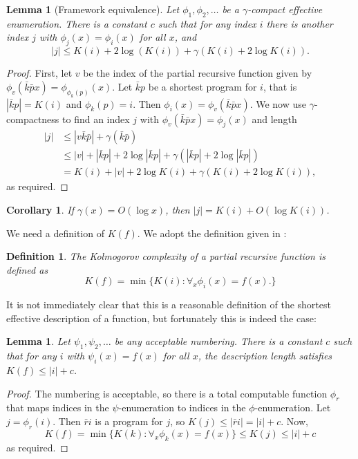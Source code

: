\documentclass{article}
\newtheorem{lemma}[theorem]{Lemma}
\newtheorem{corollary}[theorem]{Corollary}
\newtheorem{definition}{Definition}
\begin{document}
\begin{lemma}[Framework equivalence]
Let $\phi_1,\phi_2,\ldots$ be a $\gamma$-compact effective enumeration. There is a constant $c$ such that for any index $i$ there is another index $j$ with $\phi_j(x)=\phi_i(x)$ for all $x$, and
\[|j|\le K(i)+2\log(K(i))+\gamma(K(i)+2\log K(i)).\]
\end{lemma}
\begin{proof}
First, let $v$ be the index of the partial recursive function given by $\phi_v(\bar k\bar p x)=\phi_{\phi_k(p)}(x)$. Let $\bar k p$ be a shortest program for $i$, that is $|\bar k p| = K(i)$ and $\phi_k(p)=i$. Then $\phi_i(x)=\phi_v(\bar k \bar p x)$. We now use $\gamma$-compactness to find an index $j$ with $\phi_v(\bar k \bar p x)=\phi_j(x)$ and length
\[\begin{split}
|j|&\le |v\bar k\bar p|+\gamma(\bar k\bar p)\\
&\le|v|+|\bar k p|+2\log|\bar k p|+\gamma(|\bar k p|+2\log|\bar k p|)\\
&=K(i)+|v|+2\log K(i)+\gamma(K(i)+2\log K(i)),
\end{split}\]
as required.
\end{proof}
\begin{corollary}
If $\gamma(x)=O(\log x)$, then $|j|=K(i)+O(\log K(i))$.
\end{corollary}

We need a definition of $K(f)$. We adopt the definition given in \cite{TODO}:

\begin{definition}
  The Kolmogorov complexity of a partial recursive function is defined as
  \[
  K(f) = \min\{K(i):\forall_x \phi_i(x)=f(x).\}
  \]
\end{definition}

It is not immediately clear that this is a reasonable definition of the shortest effective description of a function, but fortunately this is indeed the case:

\begin{lemma}
Let $\psi_1,\psi_2,\ldots$ be any acceptable numbering. There is a constant $c$ such that for any $i$ with $\psi_i(x)=f(x)$ for all $x$, the description length satisfies $K(f)\le |i|+c$.
\end{lemma}
\begin{proof}
The numbering is acceptable, so there is a total computable function $\phi_r$ that maps indices in the $\psi$-enumeration to indices in the $\phi$-enumeration. Let $j=\phi_r(i)$. Then $\bar r i$ is a program for $j$, so $K(j)\le |\bar r i| = |i|+c$. Now,
\[
K(f)=\min\{K(k):\forall_x\phi_k(x)=f(x)\}\le K(j)\le|i|+c
\]
as required.
\end{proof}
\end{document}
